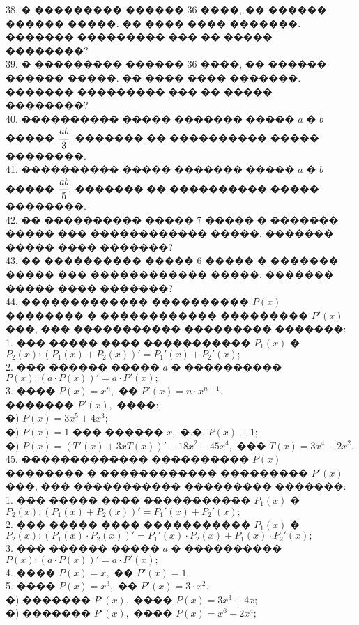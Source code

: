 \documentclass[12pt]{article}
\begin{document}
38. � ��������� ������ 36 ����, �� ������ ������ �����. �� ���� ���� �������. ������� ��������� ��� �� ����� ��������?\\
39. � ��������� ������ 36 ����, �� ������ ������ �����. �� ���� ���� �������. ������� ��������� ��� �� ����� ��������?\\
40. ���������� ����� ������� ����� $a$ � $b$ ����� $\cfrac{ab}{3}.$ ������� �� ���������� ����� ��������.\\
41. ���������� ����� ������� ����� $a$ � $b$ ����� $\cfrac{ab}{5}.$ ������� �� ���������� ����� ��������.\\
42. �� ���������� ����� 7 ����� � ������� ����� ��� ������������ �����. ������� ����� ���� �������?\\
43. �� ���������� ����� 6 ����� � ������� ����� ��� ������������ �����. ������� ����� ���� �������?\\
44. ������������� ���������� $P(x)$ �������� � ������������ ��������� $P'(x)$ ���, ��� ����������� ��������� �������:\\
1. ��� ����� ���� ����������� $P_1(x)$ � $P_2(x): \left(P_1(x)+P_2(x)\right)'=P_1'(x)+P_2'(x);$\\
2. ��� ������ ����� $a$ � ���������� $P(x): (a\cdot P(x))'=a\cdot P'(x);$\\
3. ���� $P(x)=x^n,$ �� $P'(x)=n\cdot x^{n-1}.$\\
������� $P'(x),$ ����:\\
�) $P(x)=3x^5+4x^3;$\\
�) $P(x)=1$ ��� ������ $x,$ �.�. $P(x)\equiv 1;$\\
�) $P(x)=(T'(x)+3xT(x))'-18x^2-45x^4,$ ��� $T(x)=3x^4-2x^2.$\\
45. ������������� ���������� $P(x)$ �������� � ������������ ��������� $P'(x)$ ���, ��� ����������� ��������� �������:\\
1. ��� ����� ���� ����������� $P_1(x)$ � $P_2(x): \left(P_1(x)+P_2(x)\right)'=P_1'(x)+P_2'(x);$\\
2. ��� ����� ���� ����������� $P_1(x)$ � $P_2(x): (P_1(x)\cdot P_2(x))'=P_1'(x)\cdot P_2(x)+P_1(x)\cdot P_2'(x);$\\
3. ��� ������ ����� $a$ � ���������� $P(x): (a\cdot P(x))'=a\cdot P'(x);$\\
4. ���� $P(x)=x,$ �� $P'(x)=1.$\\
5. ���� $P(x)=x^3,$ �� $P'(x)=3\cdot x^2.$\\
�) ������� $P'(x),$ ���� $P(x)=3x^3+4x;$\\
�) ������� $P'(x),$ ���� $P(x)=x^6-2x^4;$\\
\end{document}
